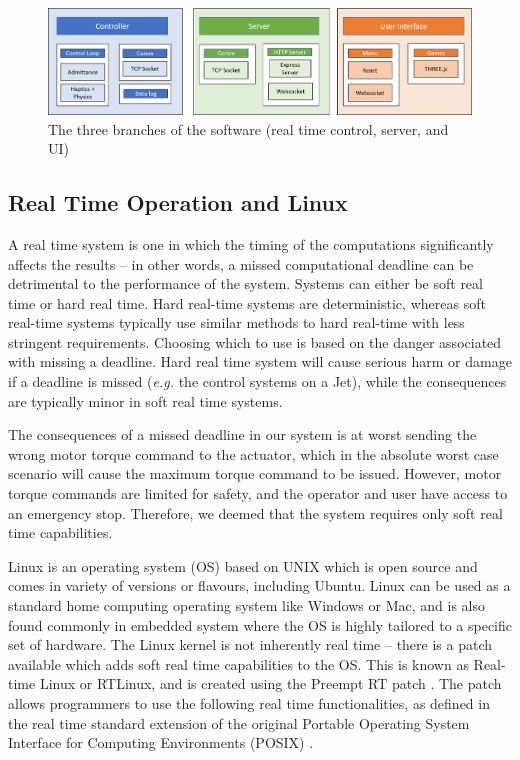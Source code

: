 \documentclass[12pt]{report}
\begin{document}
		\begin{figure}[h] 
		\centering
		\includegraphics[width=\linewidth]{software}
		\caption{The three branches of the software (real time control, server, and UI)}
		\label{fig:software}
	\end{figure} 
	

	\subsection{Real Time Operation and Linux}
	
%

A real time system is one in which the timing of the computations significantly affects the results \cite{Lewine1991} --  in other words, a missed computational deadline can be detrimental to the performance of the system. Systems can either be soft real time or hard real time. Hard real-time systems are deterministic, whereas soft real-time systems typically use similar methods to hard real-time with less stringent requirements. Choosing which to use is based on the danger associated with missing a deadline. Hard real time system will cause serious harm or damage if a deadline is missed (\textit{e.g.} the control systems on a Jet), while the consequences are typically minor in soft real time systems. 

The consequences of a missed deadline in our system is at worst sending the wrong motor torque command to the actuator, which in the absolute worst case scenario will cause the maximum torque command to be issued. However, motor torque commands are limited for safety, and the operator and user have access to an emergency stop. Therefore, we deemed that the system requires only soft real time capabilities. 

Linux is an operating system (OS) based on UNIX which is open source and comes in variety of versions or flavours, including Ubuntu. Linux can be used as a standard home computing operating system like Windows or Mac, and is also found commonly in embedded system where the OS is highly tailored to a specific set of hardware. The Linux kernel is not inherently real time -- there is a patch available which adds soft real time capabilities to the OS. This is known as Real-time Linux or RTLinux, and is created using the Preempt RT patch \cite{SebastianSiewior2019}. The patch allows programmers to use the following real time functionalities, as defined in the real time standard extension of the original Portable Operating System Interface for Computing Environments (POSIX) \cite{Obenland}.
\end{document}
